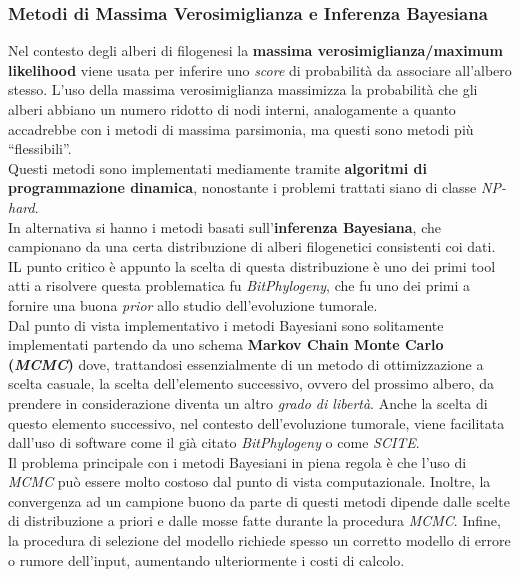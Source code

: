 \documentclass[a4paper,12pt, oneside]{book}
\begin{document}
\subsubsection{Metodi di Massima Verosimiglianza e Inferenza Bayesiana}
Nel contesto degli alberi di filogenesi la \textbf{massima
  verosimiglianza/maximum likelihood}
viene usata per inferire uno \textit{score} di probabilità da associare
all'albero stesso. L'uso della massima verosimiglianza massimizza la probabilità
che gli alberi abbiano un numero ridotto di nodi interni, analogamente a quanto
accadrebbe con i metodi di massima parsimonia, ma questi sono metodi più
``flessibili''.\\
Questi metodi sono implementati mediamente tramite \textbf{algoritmi di
  programmazione dinamica}, nonostante i problemi trattati siano di classe
\textit{NP-hard}. \\
In alternativa si hanno i metodi basati sull'\textbf{inferenza Bayesiana}, che
campionano da una certa distribuzione di alberi filogenetici consistenti coi
dati. \\
IL punto critico è appunto la scelta di questa distribuzione è uno dei primi
tool atti a risolvere questa problematica fu \textit{BitPhylogeny}, che fu uno
dei primi a fornire una buona \textit{prior} allo studio dell'evoluzione
tumorale. \\
Dal punto di vista implementativo i metodi Bayesiani sono solitamente
implementati partendo da uno schema \textbf{Markov Chain Monte Carlo
  (\textit{MCMC})} dove, trattandosi essenzialmente di un metodo di
ottimizzazione a scelta casuale, la scelta dell'elemento successivo, ovvero del
prossimo albero, da prendere in considerazione diventa un altro \textit{grado di
  libertà}. Anche la scelta di questo elemento successivo, nel contesto
dell'evoluzione tumorale, viene facilitata dall'uso di software come il già
citato  \textit{BitPhylogeny} o come \textit{SCITE}. \\
Il problema principale con i metodi Bayesiani in piena regola è che l'uso di
\textit{MCMC} può essere molto costoso dal punto di vista computazionale.
Inoltre, la convergenza ad un campione buono da parte di questi metodi dipende
dalle scelte di distribuzione a priori e dalle mosse fatte durante la procedura
\textit{MCMC}. Infine, la procedura di selezione del modello richiede spesso un
corretto modello di errore o rumore dell'input, aumentando ulteriormente i costi
di calcolo.
\end{document}
